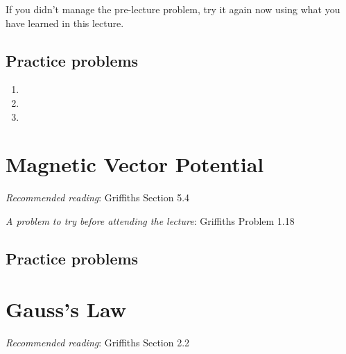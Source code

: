 \documentclass[
  letterpaper,
  DIV=11,
  numbers=noendperiod]{scrreprt}
\providecommand{\tightlist}{%
  \setlength{\itemsep}{0pt}\setlength{\parskip}{0pt}}\usepackage{longtable,booktabs,array}
\begin{document}
If you didn't manage the pre-lecture problem, try it again now using
what you have learned in this lecture.

\section{Practice problems}\label{practice-problems-4}

\begin{enumerate}
\def\labelenumi{\arabic{enumi})}
\tightlist
\item
\item
\item
\end{enumerate}


\chapter{Magnetic Vector Potential}\label{magnetic-vector-potential}

\newcommand{\l}{\mathrm{\mathbf{l}}}
\newcommand{\E}{\mathrm{\mathbf{E}}}
\newcommand{\F}{\mathrm{\mathbf{F}}}
\newcommand{\r}{\mathrm{\mathbf{r}}}

\newcommand{\x}{\mathrm{\mathbf{x}}}
\newcommand{\y}{\mathrm{\mathbf{y}}}
\newcommand{\z}{\mathrm{\mathbf{z}}}

\emph{Recommended reading}: Griffiths Section 5.4

\emph{A problem to try before attending the lecture}: Griffiths Problem
1.18

\section{Practice problems}\label{practice-problems-5}


\chapter{Gauss's Law}\label{gausss-law}

\newcommand{\l}{\mathrm{\mathbf{l}}}
\newcommand{\E}{\mathrm{\mathbf{E}}}
\newcommand{\F}{\mathrm{\mathbf{F}}}
\newcommand{\r}{\mathrm{\mathbf{r}}}

\newcommand{\x}{\mathrm{\mathbf{x}}}
\newcommand{\y}{\mathrm{\mathbf{y}}}
\newcommand{\z}{\mathrm{\mathbf{z}}}

\emph{Recommended reading}: Griffiths Section 2.2
\end{document}
